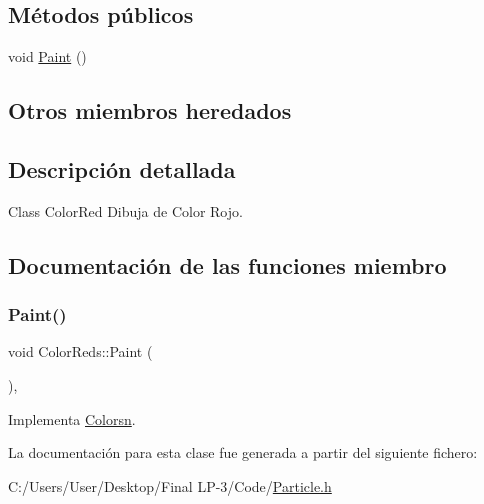 \subsection*{Métodos públicos}
\begin{DoxyCompactItemize}
\item 
void \mbox{\hyperlink{class_color_reds_afb2f2e7cbb7c0bb7c77b0a9067246590}{Paint}} ()
\end{DoxyCompactItemize}
\subsection*{Otros miembros heredados}


\subsection{Descripción detallada}
Class Color\+Red Dibuja de Color Rojo. 

\subsection{Documentación de las funciones miembro}
\mbox{\label{class_color_reds_afb2f2e7cbb7c0bb7c77b0a9067246590}} 
\subsubsection{\texorpdfstring{Paint()}{Paint()}}
{\footnotesize\ttfamily void Color\+Reds\+::\+Paint (\begin{DoxyParamCaption}{ }\end{DoxyParamCaption})\hspace{0.3cm}{\ttfamily [inline]}, {\ttfamily [virtual]}}



Implementa \mbox{\hyperlink{class_colorsn_ac9c430f99f9e990491ae0ccc49f36d59}{Colorsn}}.



La documentación para esta clase fue generada a partir del siguiente fichero\+:\begin{DoxyCompactItemize}
\item 
C\+:/\+Users/\+User/\+Desktop/\+Final L\+P-\/3/\+Code/\mbox{\hyperlink{_particle_8h}{Particle.\+h}}\end{DoxyCompactItemize}
